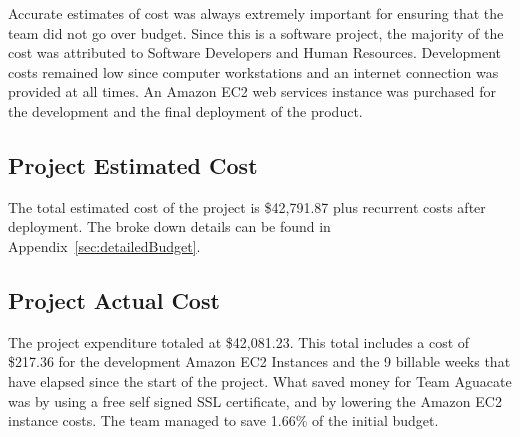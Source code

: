 \label{sec:Budget}

Accurate estimates of cost was always extremely important for ensuring that the team
did not go over budget. Since this is a software project, the majority of the
cost was attributed to Software Developers and Human Resources. Development costs
remained low since computer workstations and an internet connection was
provided at all times. An Amazon EC2 web services instance was purchased for the development and the final deployment of the product.

\subsection{Project Estimated Cost}
The total estimated cost of the project is \$42,791.87 plus recurrent costs
after deployment. The broke down details can be found in Appendix~\ref{sec:detailedBudget}.

\subsection{Project Actual Cost}
The project expenditure totaled at \$42,081.23. This total
includes a cost of \$217.36 for the development Amazon EC2 Instances and the 9 billable weeks that have elapsed since the start of the project. What saved money for Team Aguacate was by using a free self signed SSL certificate, and by lowering the Amazon EC2 instance costs. The team managed to save 1.66\% of the initial budget.
